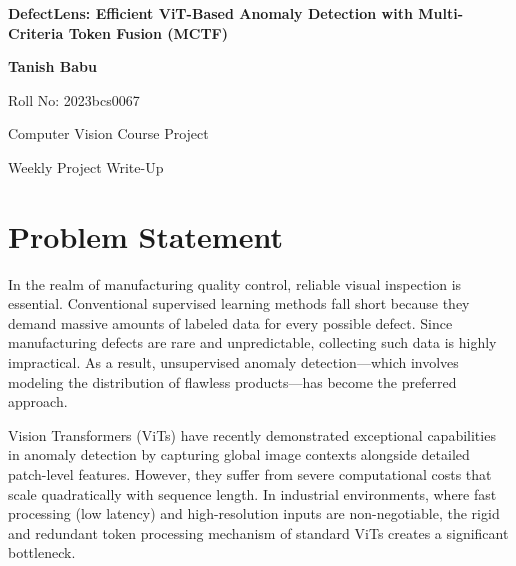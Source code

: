 \documentclass[12pt]{article}
\begin{document}
\begin{center}
    {\LARGE \textbf{DefectLens: Efficient ViT-Based Anomaly Detection with Multi-Criteria Token Fusion (MCTF)} \par}
    \vspace{0.5cm}
    {\large \textbf{Tanish Babu} \par}
    {\large Roll No: 2023bcs0067 \par}
    {\large Computer Vision Course Project \par}
    {\large Weekly Project Write-Up \par}
    \vspace{0.5cm}
\end{center}

\begin{abstract}
\noindent This document presents the foundational context and system architecture for the DefectLens project. It explores the computational bottlenecks associated with deploying Vision Transformers (ViTs) for high-resolution industrial anomaly detection. Furthermore, it outlines the rationale for utilizing a Multi-Criteria Token Fusion (MCTF) module to achieve real-time inference on edge devices, along with the specific project goals designed to balance high detection accuracy with low latency in automated inspection pipelines.
\end{abstract}

\vspace{0.5cm}

\section{Problem Statement}
In the realm of manufacturing quality control, reliable visual inspection is essential. Conventional supervised learning methods fall short because they demand massive amounts of labeled data for every possible defect. Since manufacturing defects are rare and unpredictable, collecting such data is highly impractical. As a result, unsupervised anomaly detection---which involves modeling the distribution of flawless products---has become the preferred approach.

Vision Transformers (ViTs) have recently demonstrated exceptional capabilities in anomaly detection by capturing global image contexts alongside detailed patch-level features. However, they suffer from severe computational costs that scale quadratically with sequence length. In industrial environments, where fast processing (low latency) and high-resolution inputs are non-negotiable, the rigid and redundant token processing mechanism of standard ViTs creates a significant bottleneck.
\end{document}
